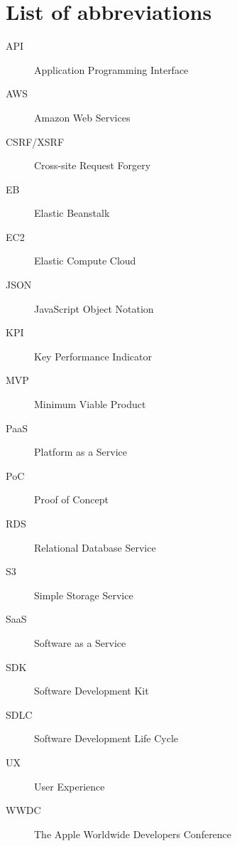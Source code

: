 \chapter{List of abbreviations}

\begin{description}
		\item[API] Application Programming Interface
		\item[AWS] Amazon Web Services
		\item[CSRF/XSRF] Cross-site Request Forgery
		\item[EB] Elastic Beanstalk
		\item[EC2] Elastic Compute Cloud
		\item[JSON] JavaScript Object Notation
		\item[KPI] Key Performance Indicator
		\item[MVP] Minimum Viable Product
		\item[PaaS] Platform as a Service
		\item[PoC] Proof of Concept
		\item[RDS] Relational Database Service
		\item[S3] Simple Storage Service
		\item[SaaS] Software as a Service
		\item[SDK] Software Development Kit
		\item[SDLC] Software Development Life Cycle
		\item[UX] User Experience
		\item[WWDC] The Apple Worldwide Developers Conference
\end{description}
	